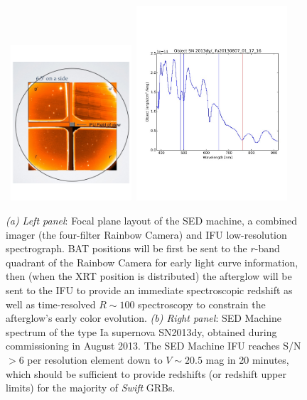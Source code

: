 \documentclass[letterpaper,11pt]{article}
\begin{document}
\begin{figure}[ht!]
\begin{center}
\hbox{
 \includegraphics[width=0.4\textwidth]{SEDM.pdf}
 \hspace{0.5cm}
 \includegraphics[width=0.5\textwidth]{SN2013dy.pdf}
 }
\end{center}
\caption{\footnotesize
{{\it (a) Left panel}: Focal plane layout of the SED machine, a combined imager 
(the four-filter Rainbow Camera) and IFU low-resolution spectrograph.  BAT positions 
will be first be sent to the $r$-band quadrant of the Rainbow Camera for early 
light curve information, then (when the XRT position is distributed) the afterglow 
will be sent to the IFU to provide an immediate spectroscopic redshift as well as 
time-resolved $R\sim100$ spectroscopy to constrain the afterglow's early color 
evolution. {\it (b) Right panel}: SED Machine spectrum of the type Ia supernova
SN2013dy, obtained during commissioning in August 2013. The SED Machine IFU
reaches S/N$>$6 per resolution element down to $V \sim 20.5$ mag in 20 minutes,
which should be sufficient to provide redshifts (or redshift upper limits) for
the majority of \textit{Swift} GRBs.}}
\label{fig2}
\end{figure}
\end{document}
